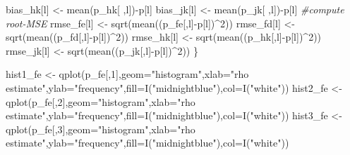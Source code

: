 \documentclass[
]{article}
\newenvironment{Shaded}{\begin{snugshade}}{\end{snugshade}}
\newcommand{\AttributeTok}[1]{\textcolor[rgb]{0.77,0.63,0.00}{#1}}
\newcommand{\CommentTok}[1]{\textcolor[rgb]{0.56,0.35,0.01}{\textit{#1}}}
\newcommand{\DecValTok}[1]{\textcolor[rgb]{0.00,0.00,0.81}{#1}}
\newcommand{\FunctionTok}[1]{\textcolor[rgb]{0.00,0.00,0.00}{#1}}
\newcommand{\NormalTok}[1]{#1}
\newcommand{\OtherTok}[1]{\textcolor[rgb]{0.56,0.35,0.01}{#1}}
\newcommand{\SpecialCharTok}[1]{\textcolor[rgb]{0.00,0.00,0.00}{#1}}
\newcommand{\StringTok}[1]{\textcolor[rgb]{0.31,0.60,0.02}{#1}}
\begin{document}
\begin{Shaded}
\begin{Highlighting}[]
\NormalTok{  bias\_hk[l] }\OtherTok{\textless{}{-}} \FunctionTok{mean}\NormalTok{(p\_hk[ ,l])}\SpecialCharTok{{-}}\NormalTok{p[l]}
\NormalTok{  bias\_jk[l] }\OtherTok{\textless{}{-}} \FunctionTok{mean}\NormalTok{(p\_jk[ ,l])}\SpecialCharTok{{-}}\NormalTok{p[l]}
  \CommentTok{\#compute root{-}MSE}
\NormalTok{  rmse\_fe[l] }\OtherTok{\textless{}{-}} \FunctionTok{sqrt}\NormalTok{(}\FunctionTok{mean}\NormalTok{((p\_fe[,l]}\SpecialCharTok{{-}}\NormalTok{p[l])}\SpecialCharTok{\^{}}\DecValTok{2}\NormalTok{))}
\NormalTok{  rmse\_fd[l] }\OtherTok{\textless{}{-}} \FunctionTok{sqrt}\NormalTok{(}\FunctionTok{mean}\NormalTok{((p\_fd[,l]}\SpecialCharTok{{-}}\NormalTok{p[l])}\SpecialCharTok{\^{}}\DecValTok{2}\NormalTok{))}
\NormalTok{  rmse\_hk[l] }\OtherTok{\textless{}{-}} \FunctionTok{sqrt}\NormalTok{(}\FunctionTok{mean}\NormalTok{((p\_hk[,l]}\SpecialCharTok{{-}}\NormalTok{p[l])}\SpecialCharTok{\^{}}\DecValTok{2}\NormalTok{))}
\NormalTok{  rmse\_jk[l] }\OtherTok{\textless{}{-}} \FunctionTok{sqrt}\NormalTok{(}\FunctionTok{mean}\NormalTok{((p\_jk[,l]}\SpecialCharTok{{-}}\NormalTok{p[l])}\SpecialCharTok{\^{}}\DecValTok{2}\NormalTok{))}
\NormalTok{\}}

\NormalTok{hist1\_fe }\OtherTok{\textless{}{-}} \FunctionTok{qplot}\NormalTok{(p\_fe[,}\DecValTok{1}\NormalTok{],}\AttributeTok{geom=}\StringTok{"histogram"}\NormalTok{,}\AttributeTok{xlab=}\StringTok{"rho estimate"}\NormalTok{,}\AttributeTok{ylab=}\StringTok{"frequency"}\NormalTok{,}\AttributeTok{fill=}\FunctionTok{I}\NormalTok{(}\StringTok{"midnightblue"}\NormalTok{),}\AttributeTok{col=}\FunctionTok{I}\NormalTok{(}\StringTok{"white"}\NormalTok{)) }
\NormalTok{hist2\_fe }\OtherTok{\textless{}{-}} \FunctionTok{qplot}\NormalTok{(p\_fe[,}\DecValTok{2}\NormalTok{],}\AttributeTok{geom=}\StringTok{"histogram"}\NormalTok{,}\AttributeTok{xlab=}\StringTok{"rho estimate"}\NormalTok{,}\AttributeTok{ylab=}\StringTok{"frequency"}\NormalTok{,}\AttributeTok{fill=}\FunctionTok{I}\NormalTok{(}\StringTok{"midnightblue"}\NormalTok{),}\AttributeTok{col=}\FunctionTok{I}\NormalTok{(}\StringTok{"white"}\NormalTok{)) }
\NormalTok{hist3\_fe }\OtherTok{\textless{}{-}} \FunctionTok{qplot}\NormalTok{(p\_fe[,}\DecValTok{3}\NormalTok{],}\AttributeTok{geom=}\StringTok{"histogram"}\NormalTok{,}\AttributeTok{xlab=}\StringTok{"rho estimate"}\NormalTok{,}\AttributeTok{ylab=}\StringTok{"frequency"}\NormalTok{,}\AttributeTok{fill=}\FunctionTok{I}\NormalTok{(}\StringTok{"midnightblue"}\NormalTok{),}\AttributeTok{col=}\FunctionTok{I}\NormalTok{(}\StringTok{"white"}\NormalTok{)) }


\end{Highlighting}
\end{Shaded}
\end{document}
